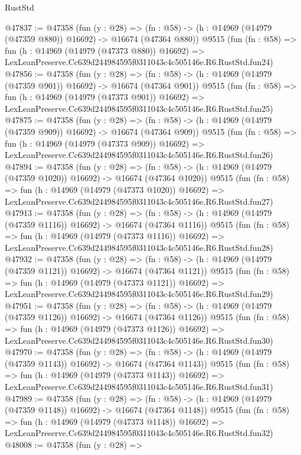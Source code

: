 \begin{lexlean}{RustStd}
\begin{coremodule}
@47837 := @47358
    (fun (y : @28) =>
    (fn : @58) -> (h : @14969 (@14979 (@47359 @880)) @16692) -> @16674 (@47364 @880))
    @9515
    (fun (fn : @58) =>
    fun (h : @14969 (@14979 (@47373 @880)) @16692) =>
    LexLeanPreserve.Cc639d244984595f0311043c4c505146e.R6.RustStd.fun24)
@47856 := @47358
    (fun (y : @28) =>
    (fn : @58) -> (h : @14969 (@14979 (@47359 @901)) @16692) -> @16674 (@47364 @901))
    @9515
    (fun (fn : @58) =>
    fun (h : @14969 (@14979 (@47373 @901)) @16692) =>
    LexLeanPreserve.Cc639d244984595f0311043c4c505146e.R6.RustStd.fun25)
@47875 := @47358
    (fun (y : @28) =>
    (fn : @58) -> (h : @14969 (@14979 (@47359 @909)) @16692) -> @16674 (@47364 @909))
    @9515
    (fun (fn : @58) =>
    fun (h : @14969 (@14979 (@47373 @909)) @16692) =>
    LexLeanPreserve.Cc639d244984595f0311043c4c505146e.R6.RustStd.fun26)
@47894 := @47358
    (fun (y : @28) =>
    (fn : @58) -> (h : @14969 (@14979 (@47359 @1020)) @16692) -> @16674 (@47364 @1020))
    @9515
    (fun (fn : @58) =>
    fun (h : @14969 (@14979 (@47373 @1020)) @16692) =>
    LexLeanPreserve.Cc639d244984595f0311043c4c505146e.R6.RustStd.fun27)
@47913 := @47358
    (fun (y : @28) =>
    (fn : @58) -> (h : @14969 (@14979 (@47359 @1116)) @16692) -> @16674 (@47364 @1116))
    @9515
    (fun (fn : @58) =>
    fun (h : @14969 (@14979 (@47373 @1116)) @16692) =>
    LexLeanPreserve.Cc639d244984595f0311043c4c505146e.R6.RustStd.fun28)
@47932 := @47358
    (fun (y : @28) =>
    (fn : @58) -> (h : @14969 (@14979 (@47359 @1121)) @16692) -> @16674 (@47364 @1121))
    @9515
    (fun (fn : @58) =>
    fun (h : @14969 (@14979 (@47373 @1121)) @16692) =>
    LexLeanPreserve.Cc639d244984595f0311043c4c505146e.R6.RustStd.fun29)
@47951 := @47358
    (fun (y : @28) =>
    (fn : @58) -> (h : @14969 (@14979 (@47359 @1126)) @16692) -> @16674 (@47364 @1126))
    @9515
    (fun (fn : @58) =>
    fun (h : @14969 (@14979 (@47373 @1126)) @16692) =>
    LexLeanPreserve.Cc639d244984595f0311043c4c505146e.R6.RustStd.fun30)
@47970 := @47358
    (fun (y : @28) =>
    (fn : @58) -> (h : @14969 (@14979 (@47359 @1143)) @16692) -> @16674 (@47364 @1143))
    @9515
    (fun (fn : @58) =>
    fun (h : @14969 (@14979 (@47373 @1143)) @16692) =>
    LexLeanPreserve.Cc639d244984595f0311043c4c505146e.R6.RustStd.fun31)
@47989 := @47358
    (fun (y : @28) =>
    (fn : @58) -> (h : @14969 (@14979 (@47359 @1148)) @16692) -> @16674 (@47364 @1148))
    @9515
    (fun (fn : @58) =>
    fun (h : @14969 (@14979 (@47373 @1148)) @16692) =>
    LexLeanPreserve.Cc639d244984595f0311043c4c505146e.R6.RustStd.fun32)
@48008 := @47358
    (fun (y : @28) =>

\end{coremodule}
\end{lexlean}
